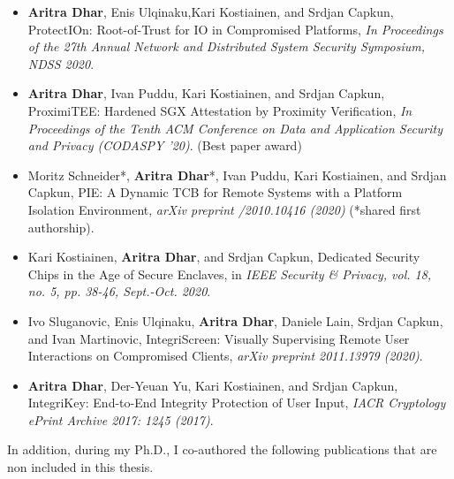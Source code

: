 \begin{itemize}
  
  \item \textbf{Aritra Dhar}, Enis Ulqinaku,Kari Kostiainen, and Srdjan Capkun, ProtectIOn: Root-of-Trust for IO in Compromised Platforms, \emph{In Proceedings of the 27th Annual Network and Distributed System Security Symposium, NDSS 2020}. 
  
  \item \textbf{Aritra Dhar}, Ivan Puddu, Kari Kostiainen, and Srdjan Capkun, ProximiTEE: Hardened SGX Attestation by Proximity Verification, \emph{In Proceedings of the Tenth ACM Conference on Data and Application Security and Privacy (CODASPY '20)}. (Best paper award)
  
  \item Moritz Schneider*, \textbf{Aritra Dhar}*, Ivan Puddu, Kari Kostiainen, and Srdjan Capkun, PIE: A Dynamic TCB for Remote Systems with a Platform Isolation Environment, \emph{arXiv preprint /2010.10416 (2020)} (*shared first authorship).
  
  \item Kari Kostiainen, \textbf{Aritra Dhar}, and Srdjan Capkun, Dedicated Security Chips in the Age of Secure Enclaves, in \emph{IEEE Security \& Privacy, vol. 18, no. 5, pp. 38-46, Sept.-Oct. 2020}.
  
  \item Ivo Sluganovic, Enis Ulqinaku, \textbf{Aritra Dhar}, Daniele Lain, Srdjan Capkun, and Ivan Martinovic, IntegriScreen: Visually Supervising Remote User Interactions on Compromised Clients, \emph{arXiv preprint 2011.13979 (2020)}.
   
  \item \textbf{Aritra Dhar}, Der-Yeuan Yu, Kari Kostiainen, and Srdjan Capkun, IntegriKey: End-to-End Integrity Protection of User Input, \emph{IACR Cryptology ePrint Archive 2017: 1245 (2017)}.
 
\end{itemize}

 In addition, during my Ph.D., I co-authored the following publications that are non included in this thesis.
 
